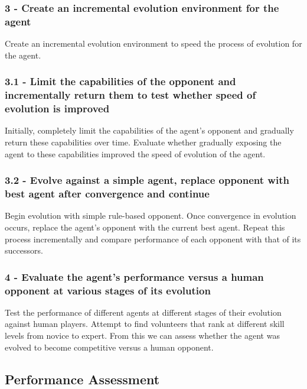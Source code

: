 \documentclass[12pt,a4paper]{article}
\begin{document}
\subsubsection*{3 - Create an incremental evolution environment for the agent}
Create an incremental evolution environment to speed the process of evolution for the agent.
\subsubsection*{3.1 - Limit the capabilities of the opponent and incrementally return them to test whether speed of evolution is improved}
Initially, completely limit the capabilities of the agent's opponent and gradually return these capabilities over time. Evaluate whether gradually exposing the agent to these capabilities improved the speed of evolution of the agent.
\subsubsection*{3.2 - Evolve against a simple agent, replace opponent with best agent after convergence and continue}
Begin evolution with simple rule-based opponent. Once convergence in evolution occurs, replace the agent's opponent with the current best agent. Repeat this process incrementally and compare performance of each opponent with that of its successors.
\subsubsection*{4 - Evaluate the agent's performance versus a human opponent at various stages of its evolution}
Test the performance of different agents at different stages of their evolution against human players. Attempt to find volunteers that rank at different skill levels from novice to expert. From this we can assess whether the agent was evolved to become competitive versus a human opponent.

\newpage
\subsection{Performance Assessment}
\end{document}
